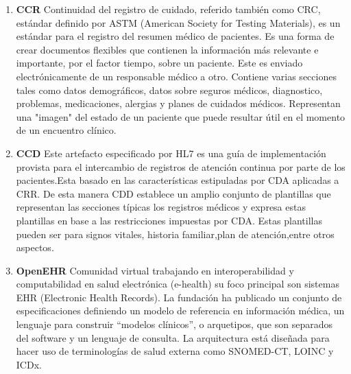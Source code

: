 \begin{enumerate}
    \item\textbf{CCR} Continuidad del registro de cuidado, referido también como CRC, estándar definido por ASTM (American Society for Testing Materials), es un estándar para el registro del resumen médico de pacientes. Es una forma de crear documentos flexibles que contienen la información más relevante e importante, por el factor tiempo, sobre un paciente. Este es enviado electrónicamente de un responsable médico a otro. Contiene varias secciones tales como datos demográficos, datos sobre seguros médicos, diagnostico, problemas, medicaciones, alergias y planes de cuidados médicos. Representan una "imagen" del estado de un paciente que puede resultar útil en el momento de un encuentro clínico.
    
    
    \item\textbf{CCD}
	Este artefacto especificado por HL7 es una guía de implementación provista para el intercambio de registros de atención continua por parte de los pacientes.Esta basado en las características estipuladas por CDA aplicadas a CRR. De esta manera CDD establece un amplio conjunto de plantillas que representan las secciones típicas los registros médicos y expresa estas plantillas en base a las restricciones impuestas por CDA. Estas plantillas pueden ser para signos vitales, historia familiar,plan de atención,entre otros aspectos. 
    
    \item\textbf{OpenEHR} Comunidad virtual trabajando en interoperabilidad y computabilidad en salud electrónica (e-health) su foco principal son sistemas EHR (Electronic Health Records). La fundación ha publicado un conjunto de especificaciones definiendo un modelo de referencia en información médica, un lenguaje para construir ``modelos clínicos'', o arquetipos, que son separados del software y un lenguaje de consulta. La arquitectura está diseñada para hacer uso de terminologías de salud externa como SNOMED-CT, LOINC y ICDx. 
    
\end{enumerate}

